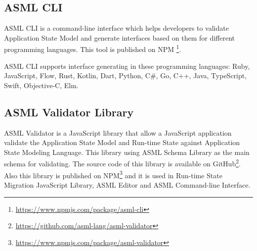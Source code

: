 \subsection{ASML CLI}
ASML CLI is a command-line interface which helps developers to validate Application State Model and generate interfaces based on them for different programming languages. This tool is published on NPM \footnote{\url{https://www.npmjs.com/package/asml-cli}}.

ASML CLI supports interface generating in these programming languages:
Ruby, JavaScript, Flow, Rust, Kotlin, Dart, Python, C\#, Go, C++, Java, TypeScript, Swift, Objective-C, Elm.

\subsection{ASML Validator Library}
ASML Validator is a JavaScript library that allow a JavaScript application validate the Application State Model and Run-time State against Application State Modeling Language. This library using ASML Schema Library as the main schema for validating. The source code of this library is available on GitHub\footnote{\url{https://github.com/asml-lang/asml-validator}}. Also this library is published on NPM\footnote{\url{https://www.npmjs.com/package/asml-validator}} and it is used in Run-time State Migration JavaScript Library, ASML Editor and ASML Command-line Interface.

